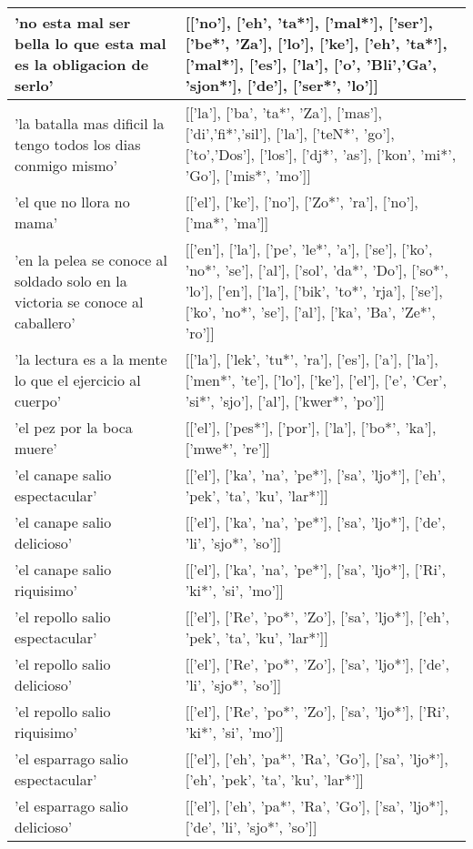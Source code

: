 \begin{longtable}{| p{} | p{} |}
'no esta mal ser bella lo que esta mal es la obligacion de serlo' & [['no'], ['eh', 'ta*'], ['mal*'], ['ser'], ['be*', 'Za'], ['lo'], ['ke'], ['eh', 'ta*'], ['mal*'], ['es'], ['la'], ['o', 'Bli','Ga', 'sjon*'], ['de'], ['ser*', 'lo']] \\ \hline
'la batalla mas dificil la tengo todos los dias conmigo mismo' & [['la'], ['ba', 'ta*', 'Za'], ['mas'], ['di','fi*','sil'], ['la'], ['teN*', 'go'], ['to','Dos'], ['los'], ['dj*', 'as'], ['kon', 'mi*', 'Go'], ['mis*', 'mo']] \\ \hline
'el que no llora no mama' & [['el'], ['ke'], ['no'], ['Zo*', 'ra'], ['no'], ['ma*', 'ma']] \\ \hline
'en la pelea se conoce al soldado solo en la victoria se conoce al caballero' & [['en'], ['la'], ['pe', 'le*', 'a'], ['se'], ['ko', 'no*', 'se'], ['al'], ['sol', 'da*', 'Do'], ['so*', 'lo'], ['en'], ['la'], ['bik', 'to*', 'rja'], ['se'], ['ko', 'no*', 'se'], ['al'], ['ka', 'Ba', 'Ze*', 'ro']] \\ \hline
'la lectura es a la mente lo que el ejercicio al cuerpo' & [['la'], ['lek', 'tu*', 'ra'], ['es'], ['a'], ['la'], ['men*', 'te'], ['lo'], ['ke'], ['el'], ['e', 'Cer', 'si*', 'sjo'], ['al'], ['kwer*', 'po']] \\ \hline
'el pez por la boca muere' & [['el'], ['pes*'], ['por'], ['la'], ['bo*', 'ka'], ['mwe*', 're']] \\ \hline
'el canape salio espectacular' & [['el'], ['ka', 'na', 'pe*'], ['sa', 'ljo*'], ['eh', 'pek', 'ta', 'ku', 'lar*']] \\ \hline
'el canape salio delicioso' & [['el'], ['ka', 'na', 'pe*'], ['sa', 'ljo*'], ['de', 'li', 'sjo*', 'so']] \\ \hline
'el canape salio riquisimo' & [['el'], ['ka', 'na', 'pe*'], ['sa', 'ljo*'], ['Ri', 'ki*', 'si', 'mo']] \\ \hline
'el repollo salio espectacular' & [['el'], ['Re', 'po*', 'Zo'], ['sa', 'ljo*'], ['eh', 'pek', 'ta', 'ku', 'lar*']] \\ \hline
'el repollo salio delicioso' & [['el'], ['Re', 'po*', 'Zo'], ['sa', 'ljo*'], ['de', 'li', 'sjo*', 'so']] \\ \hline
'el repollo salio riquisimo' & [['el'], ['Re', 'po*', 'Zo'], ['sa', 'ljo*'], ['Ri', 'ki*', 'si', 'mo']] \\ \hline
'el esparrago salio espectacular' & [['el'], ['eh', 'pa*', 'Ra', 'Go'], ['sa', 'ljo*'], ['eh', 'pek', 'ta', 'ku', 'lar*']] \\ \hline
'el esparrago salio delicioso' & [['el'], ['eh', 'pa*', 'Ra', 'Go'], ['sa', 'ljo*'], ['de', 'li', 'sjo*', 'so']] \\ \hline

\end{longtable}
